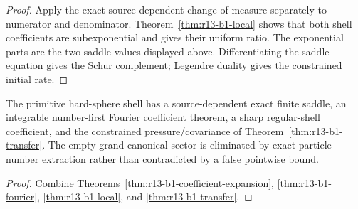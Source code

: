 \begin{proof}
Apply the exact source-dependent change of measure separately to numerator
and denominator.  Theorem~\ref{thm:r13-b1-local} shows that both shell
coefficients are subexponential and gives their uniform ratio.  The exponential
parts are the two saddle values displayed above.  Differentiating the saddle
equation gives the Schur complement; Legendre duality gives the constrained
initial rate.
\end{proof}

\begin{theorem}
\label{thm:r13-b1-main}
The primitive hard-sphere shell has a source-dependent exact finite saddle, an
integrable number-first Fourier coefficient theorem, a sharp regular-shell
coefficient, and the constrained pressure/covariance of
Theorem~\ref{thm:r13-b1-transfer}.  The empty grand-canonical sector is
eliminated by exact particle-number extraction rather than contradicted by a
false pointwise bound.
\end{theorem}

\begin{proof}
Combine Theorems~\ref{thm:r13-b1-coefficient-expansion},
\ref{thm:r13-b1-fourier}, \ref{thm:r13-b1-local}, and
\ref{thm:r13-b1-transfer}.
\end{proof}
